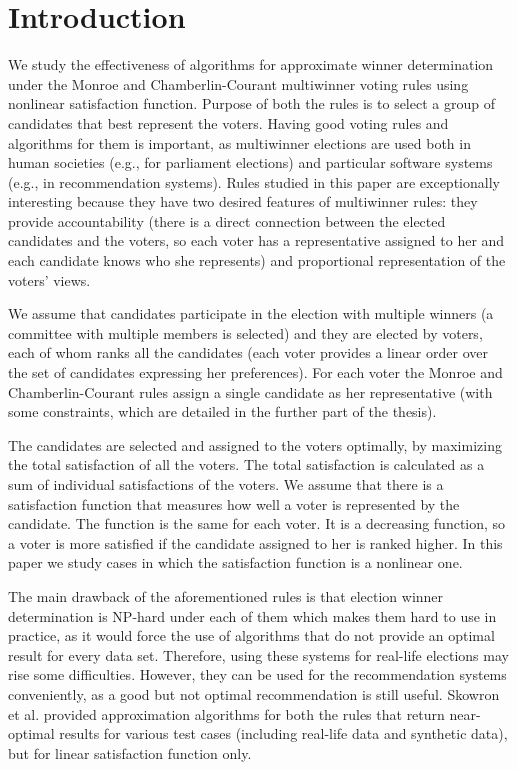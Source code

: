 \chapter{Introduction}
\label{cha:introduction}

We study the effectiveness of algorithms for approximate winner determination under the Monroe \cite{8} and Chamberlin-Courant \cite{9} multiwinner voting rules using nonlinear satisfaction function. Purpose of both the rules is to select a group of candidates that best represent the voters. Having good voting rules and algorithms for them is important, as multiwinner elections are used both in human societies (e.g., for parliament elections) and particular software systems (e.g., in recommendation systems). Rules studied in this paper are exceptionally interesting because they have two desired features of multiwinner rules: they provide accountability (there is a direct connection between the elected candidates and the voters, so each voter has a representative assigned to her and each candidate knows who she represents) and proportional representation of the voters’ views.

We assume that candidates participate in the election with multiple winners (a committee with multiple members is selected) and they are elected by voters, each of whom ranks all the candidates (each voter provides a linear order over the set of candidates expressing her preferences). For each voter the Monroe and Chamberlin-Courant rules assign a single candidate as her representative (with some constraints, which are detailed in the further part of the thesis).

The candidates are selected and assigned to the voters optimally, by maximizing the total satisfaction of all the voters. The total satisfaction is calculated as a sum of individual satisfactions of the voters. We assume that there is a  satisfaction function that measures how well a voter is represented by the candidate. The function is the same for each voter. It is a decreasing function, so a voter is more satisfied if the candidate assigned to her is ranked higher. In this paper we study cases in which the satisfaction function is a nonlinear one.

The main drawback of the aforementioned rules is that election winner determination is NP-hard under each of them \cite{2} which makes them hard to use in practice, as it would force the use of algorithms that do not provide an optimal result for every data set. Therefore, using these systems for real-life elections may rise some difficulties. However, they can be used for the recommendation systems conveniently, as a good but not optimal recommendation is still useful. Skowron et al. \cite{1} provided approximation algorithms for both the rules that return near-optimal results for various test cases (including real-life data and synthetic data), but for linear satisfaction function only.

